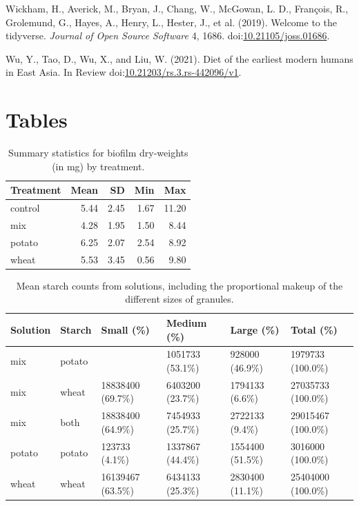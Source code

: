 \documentclass[utf8]{../templates/frontiersSCNS}
\newlength{\cslhangindent}
\newlength{\cslentryspacingunit} %
\newenvironment{CSLReferences}[2] %
 {%
  \setlength{\parindent}{0pt}
  \ifodd #1
  \let\oldpar\par
  \def\par{\hangindent=\cslhangindent\oldpar}
  \fi
  \setlength{\parskip}{#2\cslentryspacingunit}
 }%
 {}
\begin{document}
\begin{CSLReferences}{1}{0}
\leavevmode{}%
Wickham, H., Averick, M., Bryan, J., Chang, W., McGowan, L. D., François, R., Grolemund, G., Hayes, A., Henry, L., Hester, J., et al. (2019). Welcome to the {tidyverse}. \emph{Journal of Open Source Software} 4, 1686. doi:\href{https://doi.org/10.21105/joss.01686}{10.21105/joss.01686}.

\leavevmode{}%
Wu, Y., Tao, D., Wu, X., and Liu, W. (2021). Diet of the earliest modern humans in {East Asia}. {In Review} doi:\href{https://doi.org/10.21203/rs.3.rs-442096/v1}{10.21203/rs.3.rs-442096/v1}.

\end{CSLReferences}

\clearpage

\hypertarget{tables}{%
\section*{Tables}\label{tables}}

\begin{table}

\caption{\label{tab:anova-tbl}Summary statistics for biofilm dry-weights (in mg) by treatment.}
\centering
\begin{tabular}[t]{l|r|r|r|r}
\hline
Treatment & Mean & SD & Min & Max\\
\hline
control & 5.44 & 2.45 & 1.67 & 11.20\\
\hline
mix & 4.28 & 1.95 & 1.50 & 8.44\\
\hline
potato & 6.25 & 2.07 & 2.54 & 8.92\\
\hline
wheat & 5.53 & 3.45 & 0.56 & 9.80\\
\hline
\end{tabular}
\end{table}

\begin{table}

\caption{\label{tab:solution-count-tbl}Mean starch counts from solutions, including the
             proportional makeup of the different sizes of granules.}
\centering
\begin{tabular}[t]{l|l|l|l|l|l}
\hline
Solution & Starch & Small (\%) & Medium (\%) & Large (\%) & Total (\%)\\
\hline
mix & potato &  & 1051733 (53.1\%) & 928000 (46.9\%) & 1979733 (100.0\%)\\
\hline
mix & wheat & 18838400 (69.7\%) & 6403200 (23.7\%) & 1794133 (6.6\%) & 27035733 (100.0\%)\\
\hline
mix & both & 18838400 (64.9\%) & 7454933 (25.7\%) & 2722133 (9.4\%) & 29015467 (100.0\%)\\
\hline
potato & potato & 123733 (4.1\%) & 1337867 (44.4\%) & 1554400 (51.5\%) & 3016000 (100.0\%)\\
\hline
wheat & wheat & 16139467 (63.5\%) & 6434133 (25.3\%) & 2830400 (11.1\%) & 25404000 (100.0\%)\\
\hline
\end{tabular}
\end{table}
\end{document}
